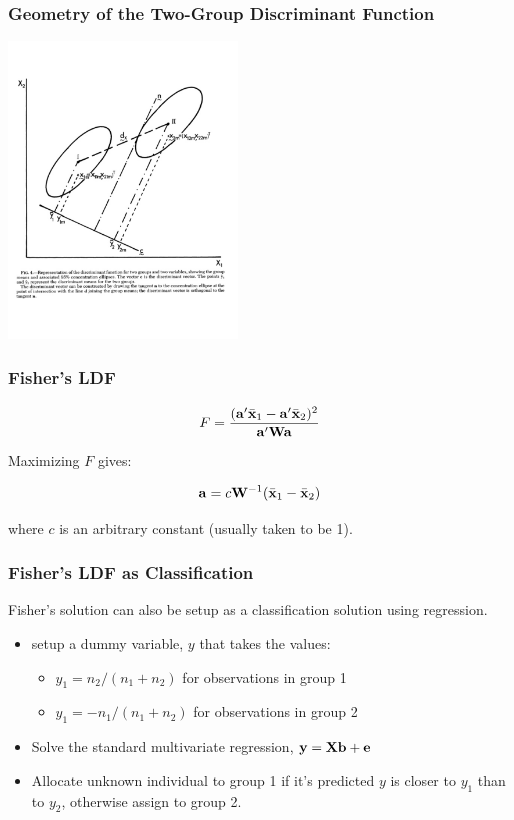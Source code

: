 \documentclass{beamer}
\begin{document}
\begin{frame}
  \frametitle{Geometry of the Two-Group Discriminant Function}
  
\begin{center}
\includegraphics[height=3.1in]{2group}
\end{center}

\end{frame}

\begin{frame}
  \frametitle{Fisher's LDF}


\[
F = \frac{(\mathbf{a}'\bar{\mathbf{x}}_1 - \mathbf{a}'\bar{\mathbf{x}}_2)^2}{\mathbf{a}'\mathbf{W}\mathbf{a}}
\]


Maximizing $F$ gives:

\[
\mathbf{a} = c\mathbf{W}^{-1}(\bar{\mathbf{x}}_1 - \bar{\mathbf{x}}_2)
\]

where $c$ is an arbitrary constant (usually taken to be 1).

\end{frame}


\begin{frame}
  \frametitle{Fisher's LDF as Classification}

Fisher's solution can also be setup as a classification solution using regression.

\begin{itemize}
\item setup a dummy variable, $y$ that takes the values:
\begin{itemize}
    \item $y_1 = n_2/(n_1 + n_2)$ for observations in group 1
    \item $y_1 = -n_1/(n_1 + n_2)$ for observations in group 2
\end{itemize}
\item Solve the standard multivariate regression, $\mathbf{y} = \mathbf{X}\mathbf{b} + \mathbf{e}$
\item Allocate unknown individual to group 1 if it's predicted $y$ is closer to $y_1$ than to $y_2$, otherwise assign to group 2.

\end{itemize}
\end{frame}
\end{document}

